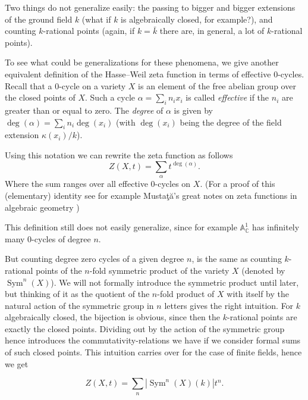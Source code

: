 \documentclass[11pt, a4paper, german]{article}
\theoremstyle{plain}
\theoremstyle{definition}
\DeclareMathOperator{\Sym}{Sym}
\begin{document}
Two things do not generalize easily: the passing to bigger and bigger extensions of the ground field $k$ (what if $k$ is algebraically closed,
for example?), and counting $k$-rational points (again, if $k = \bar{k}$ there are, in general, a lot of $k$-rational points). 

To see what could be generalizations for these phenomena, 
we give another equivalent definition of the Hasse--Weil zeta function in terms of effective 0-cycles. 
Recall that a 0-cycle on a variety $X$ is an element of the free abelian group over the closed 
points of $X$. Such a cycle $\alpha = \sum_i n_i x_i$ is called \emph{effective} if the $n_i$ are greater than or equal to zero.
The \emph{degree} of $\alpha$ is given by $\deg(\alpha) = \sum_i n_i \deg(x_i)$ 
(with $\deg(x_i)$ being the degree of the field extension $\kappa(x_i)/k$).

Using this notation we can rewrite the zeta function as follows 
\begin{equation}
    Z(X,t) = \sum_{\alpha} t^{\deg(\alpha)}.
\end{equation}
Where the sum ranges over all effective 0-cycles on $X$.
(For a proof of this (elementary) identity see for example Musta\c{t}\u{a}'s great notes on zeta functions in algebraic geometry 
\cite[Rem. 2.9]{mustata})

This definition still does not easily generalize, since for example $\mathbb{A}_{\mathbb{C}}^1$ has infinitely many 0-cycles of degree $n$.

But counting degree zero cycles of a given degree $n$, is the same as counting $k$-rational points of the $n$-fold symmetric product of the 
variety $X$ (denoted by $\Sym^n(X)$).
We will not formally introduce the symmetric product until later, but thinking of it as the quotient of 
the $n$-fold product of $X$ with itself by the natural action of the symmetric group in $n$ letters gives the right intuition. 
For $k$ algebraically closed, the bijection is obvious, since then the $k$-rational points are exactly the closed points. 
Dividing out by the action of the symmetric group hence introduces the commutativity-relations we have if we consider formal sums
of such closed points. This intuition carries over for the case of finite fields, hence we get

\begin{equation}
    Z(X,t) = \sum_{n} |\Sym^n(X)(k)| t^n.
\end{equation}
\end{document}
